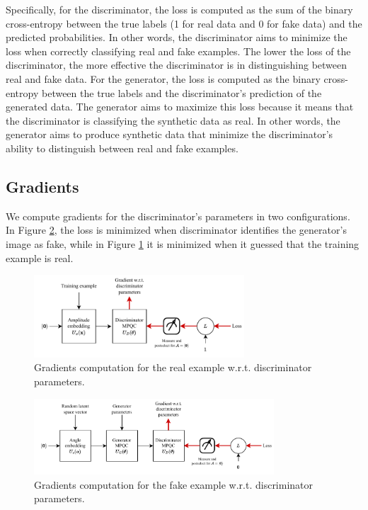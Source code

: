Specifically, for the discriminator, the loss is computed as the sum of the binary cross-entropy between the true labels (1 for real data and 0 for fake data) and the predicted probabilities. In other words, the discriminator aims to minimize the loss when correctly classifying real and fake examples. The lower the loss of the discriminator, the more effective the discriminator is in distinguishing between real and fake data.
For the generator, the loss is computed as the binary cross-entropy between the true labels and the discriminator's prediction of the generated data. The generator aims to maximize this loss because it means that the discriminator is classifying the synthetic data as real. In other words, the generator aims to produce synthetic data that minimize the discriminator's ability to distinguish between real and fake examples.

\subsection{Gradients}

We compute gradients for the discriminator's parameters in two configurations.  In Figure \ref{fig:discrim_fake}, the loss is minimized when discriminator identifies the generator's image as fake, while in Figure \ref{fig:discrim_real} it is minimized when it guessed that the training example is real.

\begin{figure}[H]
    \centering
    \includegraphics[width=0.7\textwidth]{figures/discrim_real.pdf}
    \caption{Gradients computation for the real example w.r.t. discriminator parameters.}
    \label{fig:discrim_real}
\end{figure}

\begin{figure}[H]
    \centering
    \includegraphics[width=0.8\textwidth]{figures/discrim_fake.pdf}
    \caption{Gradients computation for the fake example w.r.t. discriminator parameters.}
    \label{fig:discrim_fake}
\end{figure}

